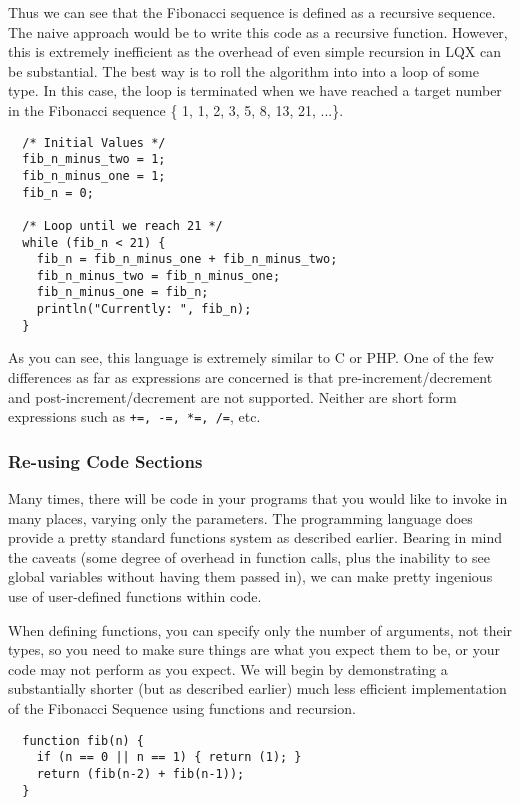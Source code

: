 Thus we can see that the Fibonacci sequence is defined as a recursive sequence.
The naive approach would be to write this code as a recursive function. However,
this is extremely inefficient as the overhead of even simple recursion in LQX
can be substantial. The best way is to roll the algorithm into into a loop of some
type. In this case, the loop is terminated when we have reached a target
number in the Fibonacci sequence \{ 1, 1, 2, 3, 5, 8, 13, 21, ...\}.

\lstset{language=LQX}
\begin{lstlisting}  
  /* Initial Values */
  fib_n_minus_two = 1;
  fib_n_minus_one = 1;
  fib_n = 0;
  
  /* Loop until we reach 21 */
  while (fib_n < 21) {
    fib_n = fib_n_minus_one + fib_n_minus_two;
    fib_n_minus_two = fib_n_minus_one;
    fib_n_minus_one = fib_n;
    println("Currently: ", fib_n);
  } 
\end{lstlisting}

As you can see, this language is extremely similar to C or PHP. One of the
few differences as far as expressions are concerned is that pre-increment/decrement 
and post-increment/decrement are not supported. Neither are short form expressions such
as {\tt +=, -=, *=, /=}, etc.

\subsubsection{Re-using Code Sections}

Many times, there will be code in your \ModLang programs that you would like to invoke
in many places, varying only the parameters. The \ModLang programming language does
provide a pretty standard functions system as described earlier. Bearing in mind the
caveats (some degree of overhead in function calls, plus the inability to see
global variables without having them passed in), we can make pretty ingenious use
of user-defined functions within \ModLang code.

When defining functions, you can specify only the number of arguments, not their
types, so you need to make sure things are what you expect them to be, or your
code may not perform as you expect. We will begin by demonstrating a substantially
shorter (but as described earlier) much less efficient implementation of the
Fibonacci Sequence using functions and recursion.

\lstset{language=LQX}
\begin{lstlisting}
  function fib(n) {
    if (n == 0 || n == 1) { return (1); }
    return (fib(n-2) + fib(n-1));
  }
\end{lstlisting}

